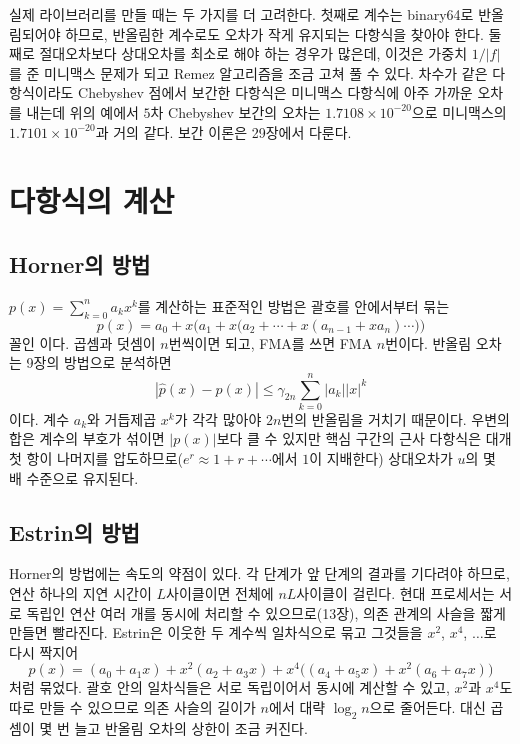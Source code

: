 실제 라이브러리를 만들 때는 두 가지를 더 고려한다. 첫째로 계수는 binary64로 반올림되어야 하므로, 반올림한 계수로도 오차가 작게 유지되는 다항식을 찾아야 한다. 둘째로 절대오차보다 상대오차를 최소로 해야 하는 경우가 많은데, 이것은 가중치 $1/|f|$를 준 미니맥스 문제가 되고 Remez 알고리즘을 조금 고쳐 풀 수 있다. 차수가 같은 다항식이라도 Chebyshev 점에서 보간한 다항식은 미니맥스 다항식에 아주 가까운 오차를 내는데 위의 예에서 $5$차 Chebyshev 보간의 오차는 $1.7108\times10^{-20}$으로 미니맥스의 $1.7101\times10^{-20}$과 거의 같다. 보간 이론은 29장에서 다룬다.

\section{다항식의 계산}
\label{sec:poly-eval}

\subsection{Horner의 방법}

$p(x)=\sum_{k=0}^na_kx^k$를 계산하는 표준적인 방법은 괄호를 안에서부터 묶는
\[
p(x)=a_0+x\bigl(a_1+x\bigl(a_2+\cdots+x(a_{n-1}+xa_n)\cdots\bigr)\bigr)
\]
꼴인 이다. 곱셈과 덧셈이 $n$번씩이면 되고, FMA를 쓰면 FMA $n$번이다. 반올림 오차는 9장의 방법으로 분석하면
\[
|\hat p(x)-p(x)|\le\gamma_{2n}\sum_{k=0}^n|a_k||x|^k
\]
이다. 계수 $a_k$와 거듭제곱 $x^k$가 각각 많아야 $2n$번의 반올림을 거치기 때문이다. 우변의 합은 계수의 부호가 섞이면 $|p(x)|$보다 클 수 있지만 핵심 구간의 근사 다항식은 대개 첫 항이 나머지를 압도하므로($e^r\approx1+r+\cdots$에서 $1$이 지배한다) 상대오차가 $u$의 몇 배 수준으로 유지된다.

\subsection{Estrin의 방법}

Horner의 방법에는 속도의 약점이 있다. 각 단계가 앞 단계의 결과를 기다려야 하므로, 연산 하나의 지연 시간이 $L$사이클이면 전체에 $nL$사이클이 걸린다. 현대 프로세서는 서로 독립인 연산 여러 개를 동시에 처리할 수 있으므로(13장), 의존 관계의 사슬을 짧게 만들면 빨라진다. Estrin은 이웃한 두 계수씩 일차식으로 묶고 그것들을 $x^2$, $x^4$, $\dots$로 다시 짝지어
\[
p(x)=(a_0+a_1x)+x^2(a_2+a_3x)+x^4\bigl((a_4+a_5x)+x^2(a_6+a_7x)\bigr)
\]
처럼 묶었다\cite{estrin1960}. 괄호 안의 일차식들은 서로 독립이어서 동시에 계산할 수 있고, $x^2$과 $x^4$도 따로 만들 수 있으므로 의존 사슬의 길이가 $n$에서 대략 $\log_2n$으로 줄어든다. 대신 곱셈이 몇 번 늘고 반올림 오차의 상한이 조금 커진다.

